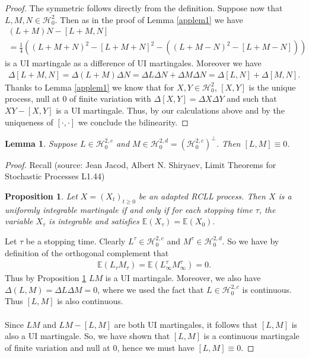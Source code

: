 \documentclass[12pt,a4paper, twoside]{article}
\newtheorem{lem}{Lemma}[section]
\newtheorem{prop}{Proposition}[section]
\theoremstyle{definition}
\newcommand{\EE}{\mathbb{E}} %
\begin{document}
\begin{proof}
The symmetric follows directly from the definition. Suppose now that $L,M,N  \in \mathcal{H}_0^2$. Then as in the proof of Lemma \ref{applem1} we have 
\begin{align*}
(L+M)N-[L+M,N] \\ = \frac{1}{4}((L+M+N)^2-[L+M+N]^2-((L+M-N)^2-[L+M-N]))
\end{align*}
is a UI martingale as a difference of UI martingales. Moreover we have
\begin{align*}
\Delta[L+M,N] = \Delta(L+M) \Delta N = \Delta L \Delta N + \Delta M \Delta N = \Delta [L,N] + \Delta[M,N].
\end{align*}
Thanks to Lemma \ref{applem1} we know that for $X,Y \in \mathcal{H}_0^2 $, $[X,Y]$ is the unique process, null at $0$ of finite variation with $\Delta[X,Y]= \Delta X \Delta Y$ and such that $XY-[X,Y]$ is a UI martingale. Thus, by our calculations above and by the uniqueness of $[ \cdot , \cdot]$ we conclude the bilinearity. 
\end{proof}
\begin{lem} Suppose $L \in \mathcal{H}_0^{2,c}$ and $M \in \mathcal{H}_0^{2,d} = ( \mathcal{H}_0^{2,c})^\perp$. Then $[L,M] \equiv 0$. 
\end{lem}
\begin{proof}
Recall (source: Jean Jacod, Albert N. Shiryaev, Limit Theorems for Stochastic Processes L1.44) 
\begin{prop} \label{propjean} Let $X=(X_t)_{t \geq 0}$ be an adapted RCLL process. Then $X$ is a uniformly integrable martingale if and only if for each stopping time $\tau$, the variable $X_\tau$ is integrable and satisfies $\EE(X_\tau)=\EE(X_0).$ 
\end{prop}
Let $\tau$ be a stopping time. Clearly $L^\tau \in \mathcal{H}_0^{2,c}$ and $M^\tau \in \mathcal{H}_0^{2,d}$. So we have by definition of the orthogonal complement that 
\begin{align*}
\EE(L_\tau M_\tau ) = \EE(L_\infty^\tau M_\infty^\tau)=0.
\end{align*}
Thus by Proposition \ref{propjean} $LM$ is a UI martingale. Moreover, we also have $\Delta(L,M)= \Delta L \Delta M=0$, where we used the fact that $L \in \mathcal{H}_0^{2,c}$ is continuous. Thus $[L,M]$ is also continuous.
\\\\
Since $LM$ and $LM-[L,M]$ are both UI martingales,  it follows that $[L,M]$ is also a UI martingale. So,  we have shown that $[L,M]$ is a continuous martingale of finite variation and null at $0$,  hence we must have $[L, M] \equiv 0$. 
\end{proof}
\end{document}
